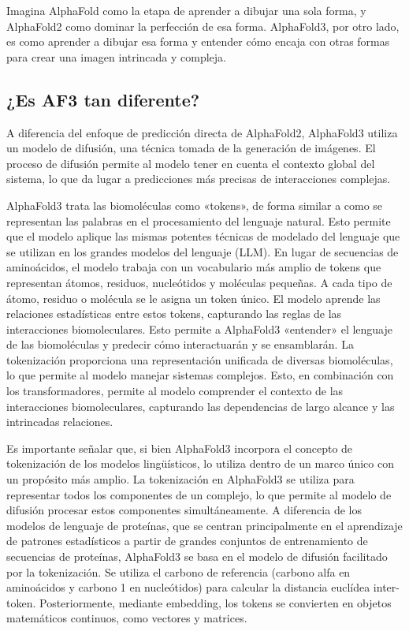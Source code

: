 Imagina AlphaFold como la etapa de aprender a dibujar una sola forma, y AlphaFold2 como dominar la perfección de esa forma. AlphaFold3, por otro lado, es como aprender a dibujar esa forma y entender cómo encaja con otras formas para crear una imagen intrincada y compleja.

\subsection{¿Es AF3 tan diferente?}
A diferencia del enfoque de predicción directa de AlphaFold2, AlphaFold3 utiliza un modelo de difusión, una técnica tomada de la generación de imágenes. El proceso de difusión permite al modelo tener en cuenta el contexto global del sistema, lo que da lugar a predicciones más precisas de interacciones complejas.

AlphaFold3 trata las biomoléculas como «tokens», de forma similar a como se representan las palabras en el procesamiento del lenguaje natural. Esto permite que el modelo aplique las mismas potentes técnicas de modelado del lenguaje que se utilizan en los grandes modelos del lenguaje (LLM). En lugar de secuencias de aminoácidos, el modelo trabaja con un vocabulario más amplio de tokens que representan átomos, residuos, nucleótidos y moléculas pequeñas. A cada tipo de átomo, residuo o molécula se le asigna un token único. El modelo aprende las relaciones estadísticas entre estos tokens, capturando las reglas de las interacciones biomoleculares. Esto permite a AlphaFold3 «entender» el lenguaje de las biomoléculas y predecir cómo interactuarán y se ensamblarán. La tokenización proporciona una representación unificada de diversas biomoléculas, lo que permite al modelo manejar sistemas complejos. Esto, en combinación con los transformadores, permite al modelo comprender el contexto de las interacciones biomoleculares, capturando las dependencias de largo alcance y las intrincadas relaciones.

Es importante señalar que, si bien AlphaFold3 incorpora el concepto de tokenización de los modelos lingüísticos, lo utiliza dentro de un marco único con un propósito más amplio. La tokenización en AlphaFold3 se utiliza para representar todos los componentes de un complejo, lo que permite al modelo de difusión procesar estos componentes simultáneamente. A diferencia de los modelos de lenguaje de proteínas, que se centran principalmente en el aprendizaje de patrones estadísticos a partir de grandes conjuntos de entrenamiento de secuencias de proteínas, AlphaFold3 se basa en el modelo de difusión facilitado por la tokenización. Se utiliza el carbono de referencia (carbono alfa en aminoácidos y carbono 1 en nucleótidos) para calcular la distancia euclídea inter-token. 
Posteriormente, mediante embedding, los tokens se convierten en objetos matemáticos continuos, como vectores y matrices. 

